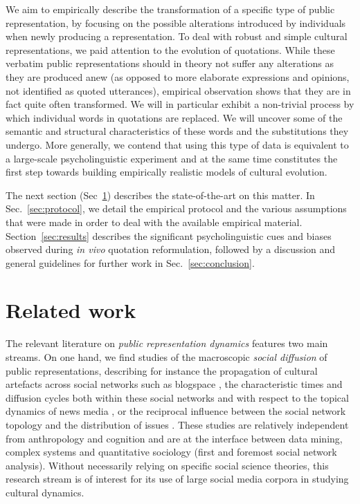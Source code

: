 We aim to empirically describe the transformation of a specific type of public representation, by focusing on the possible alterations introduced by individuals when newly producing a representation.
To deal with robust and simple cultural representations, we paid attention to the evolution of quotations.
While these verbatim public representations should in theory not suffer any alterations as they are produced anew (as opposed to more elaborate expressions and opinions, not identified as quoted utterances), empirical observation shows that they are in fact quite often transformed.
We will in particular exhibit a non-trivial process by which individual words in quotations are replaced.
We will uncover some of the semantic and structural characteristics of these words and the substitutions they undergo.
More generally, we contend that using this type of data is equivalent to a large-scale psycholinguistic experiment and at the same time constitutes the first step towards building empirically realistic models of cultural evolution.

The next section (Sec~\ref{sec:related}) describes the state-of-the-art on this matter.
In Sec.~\ref{sec:protocol}, we detail the empirical protocol and the various assumptions that were made in order to deal with the available empirical material.
Section~\ref{sec:results} describes the significant psycholinguistic cues and biases observed during \emph{in vivo} quotation reformulation, followed by a discussion and general guidelines for further work in Sec.~\ref{sec:conclusion}.

\section{Related work} %
\label{sec:related}

The relevant literature on \emph{public representation dynamics} features two main streams.
On one hand, we find studies of the macroscopic \emph{social diffusion} of public representations, describing for instance the propagation of cultural artefacts across social networks such as blogspace \citep{Gruhl04}, the characteristic times and diffusion cycles both within these social networks and with respect to the topical dynamics of news media \citep{Leskovec09}, or the reciprocal influence between the social network topology and the distribution of issues \citep{Cointet09}.
These studies are relatively independent from anthropology and cognition and are at the interface between data mining, complex systems and quantitative sociology (first and foremost social network analysis).
Without necessarily relying on specific social science theories, this research stream is of interest for its use of large social media corpora in studying cultural dynamics.
 
